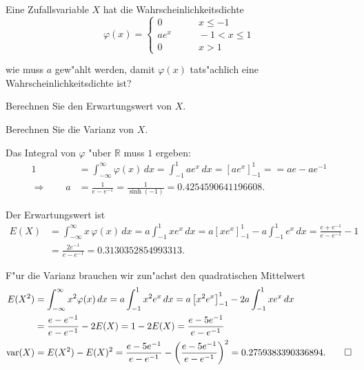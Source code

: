 Eine Zufallsvariable $X$ hat die Wahrscheinlichkeitsdichte
\[
\varphi(x)=\begin{cases}
0&\qquad x\le -1\\
ae^x&\qquad -1<x\le 1\\
0&\qquad x > 1
\end{cases}
\]
\begin{teilaufgaben}
\item wie muss $a$ gew"ahlt werden, damit $\varphi(x)$ tats"achlich eine
Wahrscheinlichkeitsdichte ist?
\item Berechnen Sie den Erwartungswert von $X$.
\item Berechnen Sie die Varianz von $X$.
\end{teilaufgaben}

\begin{loesung}
\begin{teilaufgaben}
\item
Das Integral von $\varphi$ "uber $\mathbb R$ muss $1$ ergeben:
\begin{align*}
1
&=
\int_{-\infty}^{\infty} \varphi(x)\,dx
=
\int_{-1}^1ae^x\,dx
=
\left[ae^x\right]_{-1}^1
=
=ae-ae^{-1}
\\
\Rightarrow\qquad
a&=\frac1{e-e^{-1}}=\frac1{\sinh(-1)}
=
0.4254590641196608.
\end{align*}
\item
Der Erwartungswert ist
\begin{align*}
E(X)
&=
\int_{-\infty}^\infty x\,\varphi(x)\,dx
=
a\int_{-1}^1xe^x\,dx
=
a\left[xe^x\right]_{-1}^1-a\int_{-1}^1e^x\,dx
=
\frac{e+e^{-1}}{e-e^{-1}}-1
\\
&=
\frac{2e^{-1}}{e-e^{-1}}
=
0.3130352854993313.
\end{align*}
\item
F"ur die Varianz brauchen wir zun"achst den quadratischen Mittelwert
\begin{align*}
E(X^2)
&=
\int_{-\infty}^\infty x^2\varphi(x)\, dx
=
a\int_{-1}^1 x^2e^x\,dx
=
a\left[x^2e^x\right]_{-1}^1
-
2a\int_{-1}^1xe^x\,dx
\\
&=
\frac{e-e^{-1}}{e-e^{-1}}
-2E(X)
=
1-2E(X)
=
\frac{e-5e^{-1}}{e-e^{-1}}
\\
\operatorname{var}(X)
&=
E(X^2)-E(X)^2
=
\frac{e-5e^{-1}}{e-e^{-1}}
-
\biggl(
\frac{e-5e^{-1}}{e-e^{-1}}
\biggr)^2
=
0.2759383390336894.
\qedhere
\end{align*}
\end{teilaufgaben}
\end{loesung}

